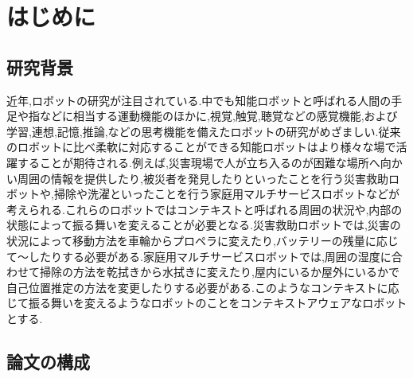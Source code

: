 
\chapter{はじめに}
\label{cha:intro}

\section{研究背景}
近年,ロボットの研究が注目されている.中でも知能ロボットと呼ばれる人間の手足や指などに相当する運動機能のほかに,視覚,触覚,聴覚などの感覚機能,および学習,連想,記憶,推論,などの思考機能を備えたロボットの研究がめざましい.従来のロボットに比べ柔軟に対応することができる知能ロボットはより様々な場で活躍することが期待される.例えば,災害現場で人が立ち入るのが困難な場所へ向かい周囲の情報を提供したり,被災者を発見したりといったことを行う災害救助ロボットや,掃除や洗濯といったことを行う家庭用マルチサービスロボットなどが考えられる.これらのロボットではコンテキストと呼ばれる周囲の状況や,内部の状態によって振る舞いを変えることが必要となる.災害救助ロボットでは,災害の状況によって移動方法を車輪からプロペラに変えたり,バッテリーの残量に応じて〜したりする必要がある.家庭用マルチサービスロボットでは,周囲の湿度に合わせて掃除の方法を乾拭きから水拭きに変えたり,屋内にいるか屋外にいるかで自己位置推定の方法を変更したりする必要がある.このようなコンテキストに応じて振る舞いを変えるようなロボットのことをコンテキストアウェアなロボットとする.



\section{論文の構成}







